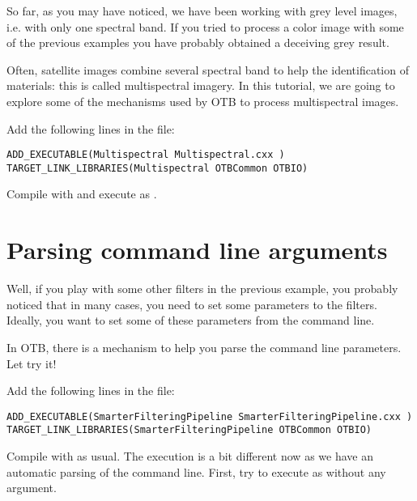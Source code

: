 So far, as you may have noticed, we have been working with grey level images,
i.e. with only one spectral band. If you tried to process a color image with 
some of the previous examples you have probably obtained a deceiving grey 
result. 

Often, satellite images combine several spectral band to help the 
identification of materials: this is called multispectral imagery. In this 
tutorial, we are going to explore some of the mechanisms used by OTB to
process multispectral images.

Add the following lines in the  file:

\begin{small}
\begin{verbatim}
ADD_EXECUTABLE(Multispectral Multispectral.cxx )
TARGET_LINK_LIBRARIES(Multispectral OTBCommon OTBIO)
\end{verbatim}
\end{small}



Compile with  and execute as .

\section{Parsing command line arguments}
\label{sec:TutorialParsing}

Well, if you play with some other filters in the previous example, you probably
noticed that in many cases, you need to set some parameters to the filters.
Ideally, you want to set some of these parameters from the command line.

In OTB, there is a mechanism to help you parse the command line parameters. Let
try it!

Add the following lines in the  file:

\begin{small}
\begin{verbatim}
ADD_EXECUTABLE(SmarterFilteringPipeline SmarterFilteringPipeline.cxx )
TARGET_LINK_LIBRARIES(SmarterFilteringPipeline OTBCommon OTBIO)
\end{verbatim}
\end{small}



Compile with  as usual. The execution is a bit different now as we
have an automatic parsing of the command line. First, try to execute as
 without any argument.

